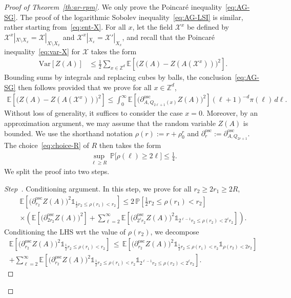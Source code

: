 \documentclass[AHL,Unicode,longabstracts]{cedram}
\newcommand{\Z}{\mathbb Z}
\newcommand{\expec}[1]{\mathbb{E}\left[#1 \right]}
\newcommand{\pr}[1]{\mathbb{P}\left[#1 \right]}
\newcommand{\prm}[1]{\mathbb{P}\big[#1 \big]}
\newcommand{\X}{\mathcal X}
\newcommand{\osc}{\partial^{\mathrm{osc}}}
\newcommand{\oscd}[1]{\mathrel{\osc_{#1}}}
\newcommand{\var}[1]{\mathrm{Var}\left[#1\right]}
\newcounter{stepcount}
\newenvironment{step}{\refstepcounter{stepcount}\begin{proof}[Step~\thestepcount]}{\let\qed\relax\end{proof}}
\begin{document}
\begin{proof}[Proof of Theorem~\ref{th:ar-rpm}]
We only prove the Poincaré inequality~\eqref{eq:AG-SG}. The proof of the logarithmic Sobolev inequality~\eqref{eq:AG-LSI} is similar, rather starting from~\eqref{eq:ent-X}. For all $x$, let the field $\X^x$ be defined by $\X^x|_{X\setminus X_{x}}=\X|_{X\setminus X_{x}}$ and $\X^x|_{X_{x}}=\X'|_{X_{x}}$, and recall that the Poincaré inequality~\eqref{eq:var-X} for $\X$ takes the form
\begin{align*}
\var{Z(A)}&\le\frac12\sum_{x\in\Z^d}\expec{\big(Z(A)-Z(A(\X^x))\big)^2}.
\end{align*}
Bounding sums by integrals and replacing cubes by balls, the conclusion~\eqref{eq:AG-SG} then follows provided that we prove for all $x\in\Z^d$,
\begin{align}\label{eq:AG-centered}
\expec{\big(Z(A)-Z(A(\X^x))\big)^2}\le\int_0^\infty \expec{\Big(\oscd{A,Q_{2\ell+1}(x)}Z(A)\Big)^2}(\ell+1)^{-d}\pi(\ell)\,d\ell.
\end{align}
Without loss of generality, it suffices to consider the case $x=0$. Moreover, by an approximation argument, we may assume that the random variable $Z(A)$ is bounded. We use the shorthand notation $\rho(r):=r+\rho_0^r$ and $\oscd{r}:=\oscd{A,Q_{2r+1}}$. The choice~\eqref{eq:choice-R} of $R$ then takes the form
\begin{align}\label{eq:choice-R2}
\sup_{\ell\ge R}\,\prm{\rho(\ell)\ge2\ell}\le\tfrac14.
\end{align}
We split the proof into two steps.

\medskip

\setcounter{stepcount}{0}
\begin{step}{Conditioning argument.}\label{step1prooftheo2.8}
In this step, we prove for all $r_2\ge 2r_1\ge2R$,
\begin{multline}\label{eq:AG-intermed}
\expec{\Big(\oscd{r_2}Z(A)\Big)^2\mathds1_{\frac12r_2\le\rho(r_1)<r_2}}\le2\,\pr{\tfrac12 r_2\le\rho(r_1)<r_2}\\
\times\left(\expec{\Big(\oscd{2r_2}Z(A)\Big)^2}+\sum_{\ell=2}^\infty\expec{\Big(\oscd{2^\ell r_2}Z(A)\Big)^2\mathds1_{2^{\ell-1}r_2\le \rho(r_2)<2^{\ell}r_2}}\right).
\end{multline}
Conditioning the LHS wrt the value of $\rho(r_2)$, we decompose
\begin{multline}\label{eq:decomp-AG-2}
\expec{\Big(\oscd{r_2}Z(A)\Big)^2\mathds1_{\frac12r_2\le\rho(r_1)<r_2}}\,\le\,\expec{\Big(\oscd{r_2}Z(A)\Big)^2\mathds1_{\frac12r_2\le\rho(r_1)<r_2}\mathds1_{\rho(r_2)<2r_2}}\\
+\sum_{\ell=2}^\infty\expec{\Big(\oscd{r_2}Z(A)\Big)^2\mathds1_{\frac12r_2\le\rho(r_1)<r_2}\mathds1_{2^{\ell-1}r_2\le\rho(r_2)<2^{\ell}r_2}}.
\end{multline}
\pagebreak


\end{step}
\end{proof}
\end{document}
